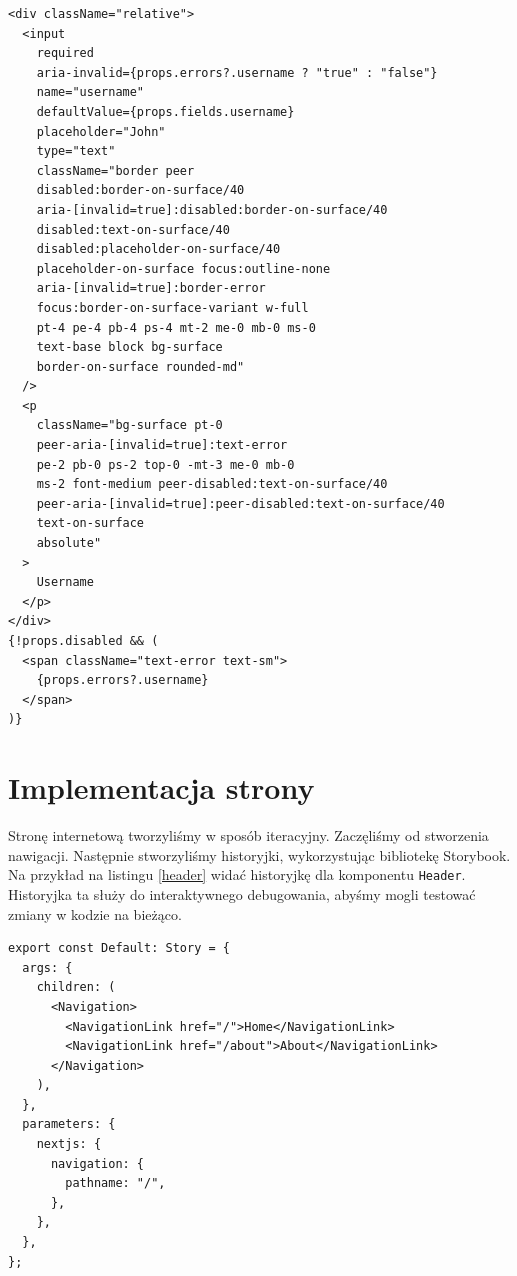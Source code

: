 \documentclass[a4paper,12pt]{book} %
\begin{document}
\begin{lstfloat}[hb]
  \lstset{language=HTML}
  \begin{lstlisting}[frame=single]
<div className="relative">
  <input
    required
    aria-invalid={props.errors?.username ? "true" : "false"}
    name="username"
    defaultValue={props.fields.username}
    placeholder="John"
    type="text"
    className="border peer
    disabled:border-on-surface/40
    aria-[invalid=true]:disabled:border-on-surface/40
    disabled:text-on-surface/40
    disabled:placeholder-on-surface/40
    placeholder-on-surface focus:outline-none
    aria-[invalid=true]:border-error
    focus:border-on-surface-variant w-full
    pt-4 pe-4 pb-4 ps-4 mt-2 me-0 mb-0 ms-0
    text-base block bg-surface
    border-on-surface rounded-md"
  />
  <p
    className="bg-surface pt-0
    peer-aria-[invalid=true]:text-error
    pe-2 pb-0 ps-2 top-0 -mt-3 me-0 mb-0
    ms-2 font-medium peer-disabled:text-on-surface/40
    peer-aria-[invalid=true]:peer-disabled:text-on-surface/40
    text-on-surface
    absolute"
  >
    Username
  </p>
</div>
{!props.disabled && (
  <span className="text-error text-sm">
    {props.errors?.username}
  </span>
)}
\end{lstlisting}
  \caption{Kod pokazujący pole formularza}\label{form_input}
\end{lstfloat}



\clearpage

\section{Implementacja strony}
Stronę internetową tworzyliśmy w sposób iteracyjny. Zaczęliśmy od stworzenia nawigacji. Następnie stworzyliśmy historyjki, wykorzystując bibliotekę Storybook. Na przykład na listingu \ref{header} widać historyjkę dla komponentu \lstinline|Header|. Historyjka ta służy do interaktywnego debugowania, abyśmy mogli testować zmiany w kodzie na bieżąco.


\begin{lstfloat}[hb]
  \lstset{language=HTML}
  \begin{lstlisting}[frame=single]
export const Default: Story = {
  args: {
    children: (
      <Navigation>
        <NavigationLink href="/">Home</NavigationLink>
        <NavigationLink href="/about">About</NavigationLink>
      </Navigation>
    ),
  },
  parameters: {
    nextjs: {
      navigation: {
        pathname: "/",
      },
    },
  },
};
\end{lstlisting}
  \caption{Historyjka dla komponentu \lstinline|Header|}\label{header}
\end{lstfloat}
\end{document}
